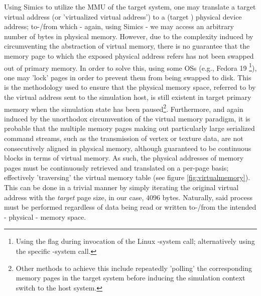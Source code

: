 Using Simics to utilize the MMU of the target system, one may translate a target virtual address (or 'virtualized virtual address') to a (target ) physical device address; to-/from which - again, using Simics - we may access an arbitrary number of bytes in physical memory.
However, due to the complexity induced by circumventing the abstraction of virtual memory, there is no guarantee that the memory page to which the exposed physical address refers has not been swapped out of primary memory.
In order to solve this, using some OSs (e.g., Fedora 19 \footnote{Using the  flag during invocation of the Linux -system call; alternatively using the specific -system call.}), one may 'lock' pages in order to prevent them from being swapped to disk.
This is the methodology used to ensure that the physical memory space, referred to by the virtual address sent to the simulation host, is still existent in target primary memory when the simulation state has been paused\footnote{Other methods to achieve this include repeatedly 'polling' the corresponding memory pages in the target system before inducing the simulation context switch to the host system.}.
Furthermore, and again induced by the unorthodox circumvention of the virtual memory paradigm, it is probable that the multiple memory pages making out particularly large serialized command streams, such as the transmission of vertex or texture data, are not consecutively aligned in physical memory, although guaranteed to be continuous blocks in terms of virtual memory.
As such, the physical addresses of memory pages must be continuously retrieved and translated on a per-page basis; effectively 'traversing' the virtual memory table (see figure \ref{fig:virtualmemory}).
This can be done in a trivial manner by simply iterating the original virtual address with the \textit{target } page size, in our case, $4096$ bytes.
Naturally, said process must be performed regardless of data being read or written to-/from the intended - physical - memory space.

